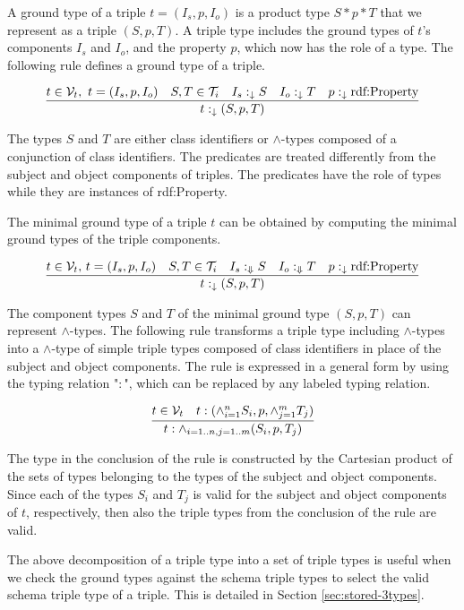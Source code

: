 \documentclass[runningheads]{llncs}
\newcommand{\darr}{\downarrow}
\newcommand{\Darr}{\Downarrow}
\newcommand{\V}{{\cal V}}
\newcommand{\T}{{\cal T}}
\begin{document}
A ground type of a triple $t=(I_s,p,I_o)$ is a product type
$S*p*T$ that we represent as a triple $(S,p,T)$. A triple type
includes the ground types of $t$'s components $I_s$ and $I_o$, and the
property $p$, which now has the role of a type. The following rule defines a ground type of a triple.

\begin{equation}
\label{rul:3-ground}
\dfrac{t\in\V_t,\ t=(I_s,p,I_o)\quad S,T\in\T_i\quad I_s:_\darr\/S\quad I_o:_\darr\/T\quad p:_\darr\text{rdf:Property}}
      {t:_\darr(S,p,T)}
\end{equation}

The types $S$ and $T$ are either class identifiers or $\land$-types
composed of a conjunction of class identifiers. The predicates are
treated differently from the subject and object components of
triples. The predicates have the role of types while they are
instances of rdf:Property.

The minimal ground type of a triple $t$ can be obtained by computing
the minimal ground types of the triple components.

\begin{equation}
\label{rul:3-min-ground}
\dfrac{t\in\V_t,\, t=(I_s,p,I_o)\quad S,T\in\T_i\quad I_s:_\Darr\/S\quad I_o:_\Darr\/T\quad p:_\darr\text{rdf:Property}}
      {t:_\darr\/(S,p,T)}
\end{equation}

The component types $S$ and $T$ of the minimal ground type $(S,p,T)$
can represent $\land$-types. The following rule transforms a triple
type including $\land$-types into a $\land$-type of simple triple
types composed of class identifiers in place of the subject and object
components. The rule is expressed in a general form by using the
typing relation "$:$", which can be replaced by any labeled typing
relation.

\begin{equation}
\label{rul:3-land-transform}
\dfrac{t\in\V_t\quad t:(\land_{i=1}^n\/S_i,p,\land_{j=1}^m\/T_j)}
      {t:\land_{i=1..n, j=1..m}(S_i,p,T_j)}
\end{equation}

The type in the conclusion of the rule is constructed by the Cartesian
product of the sets of types belonging to the types of the subject and
object components. Since each of the types $S_i$ and $T_j$ is valid
for the subject and object components of $t$, respectively, then also the triple types from the conclusion of the rule are valid.

The above decomposition of a triple type into a set of triple types is
useful when we check the ground types against the schema triple types
to select the valid schema triple type of a triple. This is detailed in
Section \ref{sec:stored-3types}.
\end{document}
